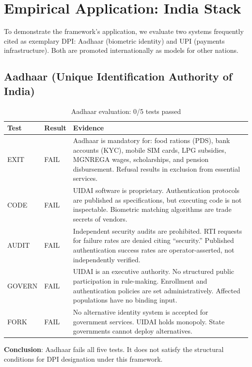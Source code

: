 \documentclass[11pt,a4paper]{article}
\newcommand{\tfail}{\textcolor{failred}{FAIL}}
\begin{document}
\section{Empirical Application: India Stack}

To demonstrate the framework's application, we evaluate two systems frequently cited as exemplary DPI: Aadhaar (biometric identity) and UPI (payments infrastructure). Both are promoted internationally as models for other nations.

\subsection{Aadhaar (Unique Identification Authority of India)}

\begin{table}[htbp]
\centering
\begin{tabular}{@{}llp{7cm}@{}}
\toprule
\textbf{Test} & \textbf{Result} & \textbf{Evidence} \\
\midrule
EXIT & \tfail & Aadhaar is mandatory for: food rations (PDS), bank accounts (KYC), mobile SIM cards, LPG subsidies, MGNREGA wages, scholarships, and pension disbursement. Refusal results in exclusion from essential services. \\
\addlinespace
CODE & \tfail & UIDAI software is proprietary. Authentication protocols are published as specifications, but executing code is not inspectable. Biometric matching algorithms are trade secrets of vendors. \\
\addlinespace
AUDIT & \tfail & Independent security audits are prohibited. RTI requests for failure rates are denied citing ``security.'' Published authentication success rates are operator-asserted, not independently verified. \\
\addlinespace
GOVERN & \tfail & UIDAI is an executive authority. No structured public participation in rule-making. Enrollment and authentication policies are set administratively. Affected populations have no binding input. \\
\addlinespace
FORK & \tfail & No alternative identity system is accepted for government services. UIDAI holds monopoly. State governments cannot deploy alternatives. \\
\bottomrule
\end{tabular}
\caption{Aadhaar evaluation: 0/5 tests passed}
\end{table}

\textbf{Conclusion}: Aadhaar fails all five tests. It does not satisfy the structural conditions for DPI designation under this framework.
\end{document}
